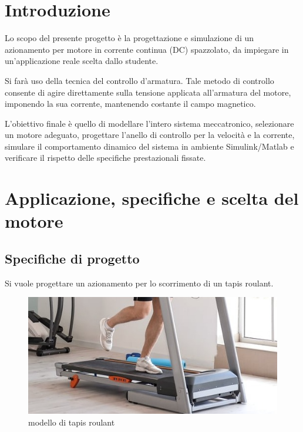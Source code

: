 \documentclass[a4paper,12pt]{article}
\begin{document}
\renewcommand{\contentsname}{Indice}
\tableofcontents 

\pagebreak


\section{Introduzione}

Lo scopo del presente progetto è la progettazione e simulazione di un azionamento per motore in corrente continua (DC) spazzolato, da impiegare in un'applicazione reale scelta dallo studente.

Si farà uso della tecnica del controllo d'armatura. Tale metodo di controllo consente di agire direttamente sulla tensione applicata all'armatura del motore, imponendo la sua corrente, mantenendo costante il campo magnetico.

L’obiettivo finale è quello di modellare l’intero sistema meccatronico, selezionare un motore adeguato, progettare l’anello di controllo per la velocità e la corrente, simulare il comportamento dinamico del sistema in ambiente Simulink/Matlab e verificare il rispetto delle specifiche prestazionali fissate.




\pagebreak

\section{Applicazione, specifiche e scelta del motore}

\subsection{Specifiche di progetto}

Si vuole progettare un azionamento per lo scorrimento di un tapis roulant.

\begin{figure}[h!]
    \centering
    \includegraphics[scale=0.7]{Immagini/Altre/tapis.PNG}
    \caption{modello di tapis roulant}
    \label{fig: tapis}
\end{figure}
\end{document}
